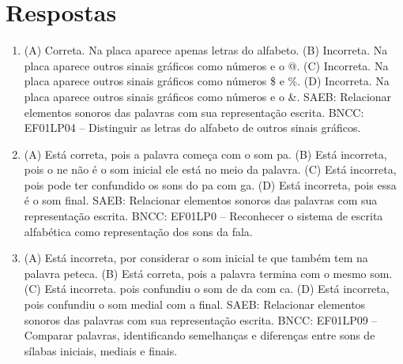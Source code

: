 \chapter{Respostas}
\pagestyle{plain}
\footnotesize

\pagecolor{gray!40}


\begin{enumerate}
\item
(A) Correta. Na placa aparece apenas letras do alfabeto.
(B) Incorreta. Na placa aparece outros sinais gráficos como números e o @.
(C) Incorreta. Na placa aparece outros sinais gráficos como números \$ e \%.
(D) Incorreta. Na placa aparece outros sinais gráficos como números e o \&.
SAEB: Relacionar elementos sonoros das palavras com sua representação escrita. 
BNCC: EF01LP04 -- Distinguir as letras do alfabeto de outros sinais gráficos. 

\item
(A) Está correta, pois a palavra começa com o som pa.
(B) Está incorreta, pois o ne não é o som inicial ele está no meio da palavra.
(C) Está incorreta, pois pode ter confundido os sons do pa com ga.
(D) Está incorreta, pois essa é o som final.
SAEB: Relacionar elementos sonoros das palavras com sua representação escrita.
BNCC: EF01LP0 -- Reconhecer o sistema de escrita alfabética como
representação dos sons da fala.

\item
(A) Está incorreta, por considerar o som inicial te que também tem na palavra peteca.
(B) Está correta, pois a palavra termina com o mesmo som.
(C) Está incorreta. pois confundiu o som de da com ca.
(D) Está incorreta, pois confundiu o som medial com a final.
SAEB: Relacionar elementos
sonoros das palavras com sua representação escrita.
BNCC: EF01LP09 -- Comparar palavras, identificando semelhanças e diferenças
entre sons de sílabas iniciais, mediais e finais.
\end{enumerate}


